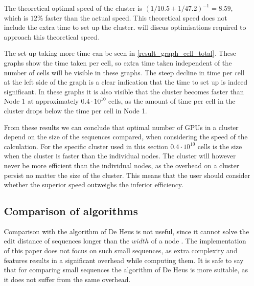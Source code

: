 The theoretical optimal speed of the cluster is $(1/10.5 + 1/47.2)^{-1} = 8.59$, which is $12\%$ faster than the actual speed.
This theoretical speed does not include the extra time to set up the cluster.
 will discus optimisations required to approach this theoretical speed.

The set up taking more time can be seen in \cref{result_graph_cell_total}.
These graphs show the time taken per cell, so extra time taken independent of the number of cells will be visible in these graphs.
The steep decline in time per cell at the left side of the graph is a clear indication that the time to set up is indeed significant.
In these graphs it is also visible that the cluster becomes faster than Node 1 at approximately $0.4 \cdot 10^{10}$ cells, as the amount of time per cell in the cluster drops below the time per cell in Node 1.

From these results we can conclude that optimal number of GPUs in a cluster depend on the size of the sequences compared, when considering the speed of the calculation.
For the specific cluster used in this section $0.4 \cdot 10^{10}$ cells is the size when the cluster is faster than the individual nodes.
The cluster will however never be more efficient than the individual nodes, as the overhead on a cluster persist no matter the size of the cluster.
This means that the user should consider whether the superior speed outweighs the inferior efficiency.

\subsection{Comparison of algorithms} \label{compare}
Comparison with the algorithm of De Heus is not useful, since it cannot solve the edit distance of sequences longer than the $width$ of a node \cite{Heus}.
The implementation of this paper does not focus on such small sequences, as extra complexity and features results in a significant overhead while computing them.
It is safe to say that for comparing small sequences the algorithm of De Heus is more suitable, as it does not suffer from the same overhead.


\begin{comment}
\subsection{Comparison with CPU implementations}
Comparing the implementation with CPU based algorithms is also not useful, as there is no reliable method to compare the performance of CPUs with GPUs apart from running the implementation on each of them.
The difference between CPUs and GPUs is significantly

A more expensive device will not necessarily have a better performance, so even the cost does not serve as a reliable benchmark.

Even the cost of the devices is not a reliable benchmark as manufacturers do not publish the production cost of a device and use different profit margins.
That is why no such comparison is included.
\end{comment}
